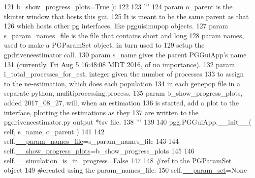 \begin{DoxyCode}
121                         b\_show\_progress\_plots=\textcolor{keyword}{True} ):
122 
123         \textcolor{stringliteral}{'''}
124 \textcolor{stringliteral}{        param o\_parent is the tkinter window that hosts this gui.  }
125 \textcolor{stringliteral}{            It is meant to be the same parent as that }
126 \textcolor{stringliteral}{            which hosts other pg interfaces, like pgguisimupop objects.}
127 \textcolor{stringliteral}{        param s\_param\_names\_file is the file that contains short and long }
128 \textcolor{stringliteral}{            param names, used to make a PGParamSet object, in turn used to }
129 \textcolor{stringliteral}{            setup the gpdriveneestimator call.}
130 \textcolor{stringliteral}{        param s\_name gives the parent PGGuiApp's name }
131 \textcolor{stringliteral}{            (currently, Fri Aug  5 16:48:08 MDT 2016, of no importance).}
132 \textcolor{stringliteral}{        param i\_total\_processes\_for\_est, integer given the number of processes }
133 \textcolor{stringliteral}{            to assign to the ne-estimation, which does each population }
134 \textcolor{stringliteral}{            in each genepop file in a separate python, mulitiprocessing.process.}
135 \textcolor{stringliteral}{        param b\_show\_progress\_plots, added 2017\_08\_27, will, when an estimation}
136 \textcolor{stringliteral}{        is started, add a plot to the interface, plotting the estimations as they}
137 \textcolor{stringliteral}{        are written to the pgdriveneestimator.py output *tsv file.}
138 \textcolor{stringliteral}{        '''}
139                 
140         pgg.PGGuiApp.\_\_init\_\_( self, s\_name, o\_parent )
141 
142         self.\hyperlink{classnegui_1_1pgguineestimator__experimental_1_1PGGuiNeEstimator_aca9e01e24f7ac3622eeea490d6b10569}{\_\_param\_names\_file}=s\_param\_names\_file
143 
144         self.\hyperlink{classnegui_1_1pgguineestimator__experimental_1_1PGGuiNeEstimator_a6eb55644b1ccacda24ba751800554726}{\_\_show\_progress\_plots}=b\_show\_progress\_plots
145 
146         self.\hyperlink{classnegui_1_1pgguineestimator__experimental_1_1PGGuiNeEstimator_a2e985776aeb400b6b8b950a3c69ebd01}{\_\_simulation\_is\_in\_progress}=\textcolor{keyword}{False}
147 
148         \textcolor{comment}{#ref to the PGParamSet object}
149         \textcolor{comment}{#created using the param\_names\_file:}
150         self.\hyperlink{classnegui_1_1pgguineestimator__experimental_1_1PGGuiNeEstimator_ae3ea770f2e0d55221c96ea48bf857f9e}{\_\_param\_set}=\textcolor{keywordtype}{None}

\end{DoxyCode}
